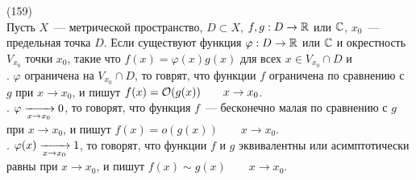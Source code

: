 (159)\\
Пусть $X$~--- метрической пространство, $D \subset X$, $f, g: D \to \mathbb{R}$ или $\mathbb{C}$, $x_0$~--- предельная точка $D$. Если существуют функция $\varphi: D \to \mathbb{R}$ или $\mathbb{C}$ и окрестность $V_{x_0}$ точки $x_0$, такие что $f(x) = \varphi(x)g(x)$ для всех $x \in V_{x_0} \cap D$ и\\
. $\varphi$ ограничена на $V_{x_0} \cap D$, то говрят, что функции $f$ ограничена по сравнению с $g$ при $x \to x_0$, и пишут $f(x) = \mathcal{O}(g(x)) \qquad x \to x_0$.\\
. $\varphi \xrightarrow[x\to x_0]{} 0$, то говорят, что функция $f$~--- бесконечно малая по сравнению с $g$ при $x \to x_0$, и пишут $f(x) = o(g(x)) \qquad x \to x_0$.\\
. $\varphi(x) \xrightarrow[x\to x_0]{} 1$, то говорят, что функции $f$ и $g$ эквивалентны или асимптотически равны при $x \to x_0$, и пишут $f(x) \sim g(x) \qquad x \to x_0$.